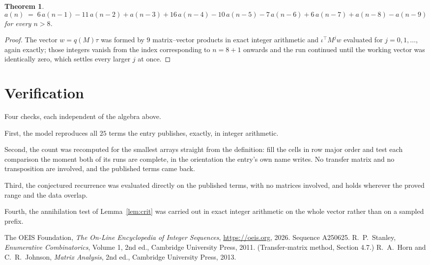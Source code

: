 \documentclass[11pt,a4paper]{article}
\theoremstyle{plain}
\newtheorem{theorem}{Theorem}
\theoremstyle{definition}
\begin{document}
\begin{theorem}
\[
a(n)\;=\;6\,a(n-1) - 11\,a(n-2) + a(n-3) + 16\,a(n-4) - 10\,a(n-5) - 7\,a(n-6) + 6\,a(n-7) + a(n-8) - a(n-9)
\]
for every $n>8$.
\end{theorem}

\begin{proof}
The vector $w=q(M)\tau$ was formed by $9$ matrix--vector products in exact integer
arithmetic and $\iota^{\!\top}M^{j}w$ evaluated for $j=0,1,\dots$, again exactly; those
integers vanish from the index corresponding to $n=8+1$ onwards and the run continued
until the working vector was identically zero, which settles every larger $j$ at once.
\end{proof}

\section{Verification}

Four checks, each independent of the algebra above.

First, the model reproduces all $25$ terms the entry publishes, exactly, in integer
arithmetic.

Second, the count was recomputed for the smallest arrays straight from the definition: fill the
cells in row major order and test each comparison the moment both of its runs are complete,
in the orientation the entry's own name writes. No transfer matrix and no transposition are
involved, and the published terms came back.

Third, the conjectured recurrence was evaluated directly on the published terms, with no
matrices involved, and holds wherever the proved range and the data overlap.

Fourth, the annihilation test of Lemma~\ref{lem:crit} was carried out in exact integer
arithmetic on the whole vector rather than on a sampled prefix.

\begin{thebibliography}{9}
 The OEIS Foundation, \emph{The On-Line Encyclopedia of Integer
Sequences}, \url{https://oeis.org}, 2026. Sequence A250625.
 R.~P.~Stanley, \emph{Enumerative Combinatorics}, Volume 1, 2nd ed.,
Cambridge University Press, 2011. (Transfer-matrix method, Section 4.7.)
 R.~A.~Horn and C.~R.~Johnson, \emph{Matrix Analysis}, 2nd ed., Cambridge
University Press, 2013.
\end{thebibliography}
\end{document}

